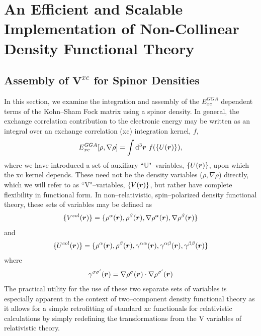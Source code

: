 \section{An Efficient and Scalable Implementation of Non-Collinear Density Functional Theory}
\label{sec:NCDFT}

\subsection{Assembly of $\mathbf{V}^{xc}$ for Spinor Densities}

In this section, we examine the integration and assembly of the $E^{GGA}_{xc}$ dependent terms of
the Kohn--Sham Fock matrix using a spinor density. In general, the exchange correlation contribution to the
electronic energy may be written as an integral over an exchange correlation (xc) integration kernel, $f$,
\begin{equation}
  \label{eq:EXCGGA}
E_{xc}^{GGA}[\rho, \nabla \rho] = \int \mathrm{d}^3 \boldsymbol{r} \text{  }f(\{ U(\boldsymbol{r}) \}) ,
\end{equation}
where we have introduced a set of auxiliary ``U"--variables, $\{U(\boldsymbol{r})\}$, upon which
the xc kernel depends. These need not be the density variables ($\rho, \nabla \rho$) directly,
which we will refer to as ``V"--variables, $\{V(\boldsymbol{r})\}$, but rather have complete flexibility in
functional form. In non--relativistic, spin--polarized density functional theory, these sets of variables
may be defined as
\begin{equation}
  \label{eq:Vcol}
  \{ V^{col}(\boldsymbol{r}) \} = \{ \rho^\alpha(\boldsymbol{r}), \rho^\beta(\boldsymbol{r}), \nabla \rho^\alpha(\boldsymbol{r}), \nabla \rho^\beta(\boldsymbol{r}) \} 
\end{equation}
and
\begin{equation}
  \label{eq:Ucol}
  \{ U^{col}(\boldsymbol{r}) \} = \{ \rho^\alpha(\boldsymbol{r}), \rho^\beta(\boldsymbol{r}), \gamma^{\alpha\alpha}(\boldsymbol{r}), \gamma^{\alpha\beta}(\boldsymbol{r}), \gamma^{\beta\beta}(\boldsymbol{r}) \}
\end{equation}
where
\begin{equation}
  \gamma^{\sigma\sigma'}(\boldsymbol{r}) = \nabla \rho^\sigma(\boldsymbol{r}) \cdot \nabla \rho^{\sigma'}(\boldsymbol{r})
\end{equation}
The practical utility for the use of these two separate sets of variables 
is especially apparent in the context of two--component density functional theory
as it allows for a simple retrofitting of standard xc functionals for relativistic calculations
by simply redefining the transformations from the V variables of relativistic theory. 

